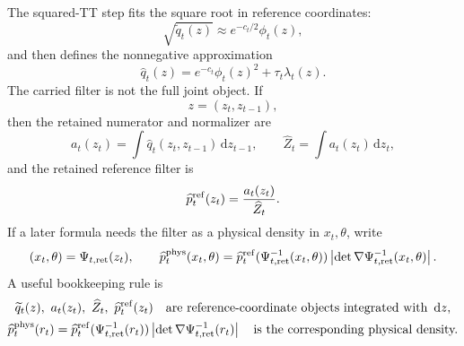 \documentclass[11pt]{article}
\numberwithin{equation}{section}
\newcommand{\dd}{\,\mathrm d}
\begin{document}
The squared-TT step fits the square root in reference coordinates:
\begin{equation}
    \sqrt{\widetilde q_t(z)}
    \approx
    e^{-c_t/2}\phi_t(z),
    \label{eq:p25-walk-5}
\end{equation}
and then defines the nonnegative approximation
\begin{equation}
    \widehat q_t(z)
    =
    e^{-c_t}\phi_t(z)^2+\tau_t\lambda_t(z).
    \label{eq:p25-walk-6}
\end{equation}
The carried filter is not the full joint object.  If
\begin{equation}
    z=(z_t,z_{t-1}),
    \label{eq:p25-walk-7}
\end{equation}
then the retained numerator and normalizer are
\begin{equation}
    a_t(z_t)
    =
    \int\widehat q_t(z_t,z_{t-1})\dd z_{t-1},
    \qquad
    \widehat Z_t
    =
    \int a_t(z_t)\dd z_t,
    \label{eq:p25-walk-8}
\end{equation}
and the retained reference filter is
\begin{equation}
    \widehat p_t^{\rm ref}(z_t)
    =
    \frac{a_t(z_t)}{\widehat Z_t}.
    \label{eq:p25-walk-9}
\end{equation}
If a later formula needs the filter as a physical density in \(x_t,\theta\),
write
\begin{equation}
    (x_t,\theta)=\Psi_{t,\rm ret}(z_t),
    \qquad
    \widehat p_t^{\rm phys}(x_t,\theta)
    =
    \widehat p_t^{\rm ref}(\Psi_{t,\rm ret}^{-1}(x_t,\theta))
    \left|\det\nabla\Psi_{t,\rm ret}^{-1}(x_t,\theta)\right|.
    \label{eq:p25-walk-10}
\end{equation}
A useful bookkeeping rule is
\begin{equation}
\begin{gathered}
    \widetilde q_t(z),\ a_t(z_t),\ \widehat Z_t,\ 
    \widehat p_t^{\rm ref}(z_t)
    \quad\text{are reference-coordinate objects integrated with } \dd z,\\
    \widehat p_t^{\rm phys}(r_t)
    =
    \widehat p_t^{\rm ref}(\Psi_{t,\rm ret}^{-1}(r_t))
    \left|\det\nabla\Psi_{t,\rm ret}^{-1}(r_t)\right|
    \quad\text{is the corresponding physical density.}
\end{gathered}
    \label{eq:p25-walk-measure-bookkeeping}
\end{equation}
\end{document}
